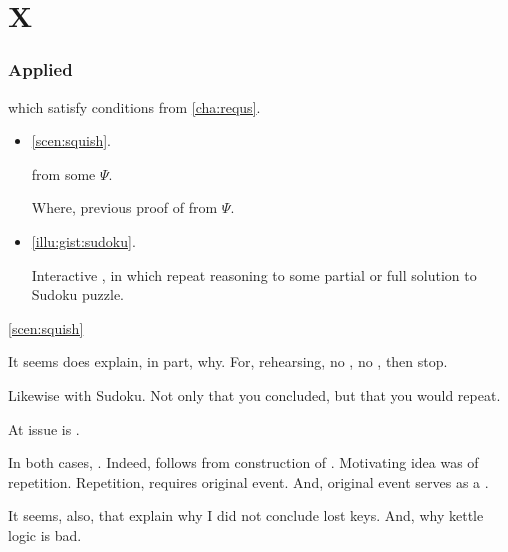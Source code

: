 \section{X}
\label{sec:x}


\subsubsection{Applied}
\label{sec:consequences}


\begin{note}
   which satisfy conditions from \autoref{cha:requs}.
  \begin{itemize}
  \item
    \autoref{scen:squish}.

     from some \pool{} \(\Psi\).

    Where, previous proof of  from \(\Psi\).
  \item
    \autoref{illu:gist:sudoku}.

    Interactive , in which  repeat reasoning to some partial or full solution to Sudoku puzzle.
  \end{itemize}
\end{note}

\begin{note}
  \autoref{scen:squish}

  It seems does explain, in part, why.
  For, rehearsing, no \ros{}, no \fc{}, then stop.

  Likewise with Sudoku.
  Not only that you concluded, but that you would repeat.

  At issue is \tC{}.
\end{note}

\begin{note}
  In both cases, \wit{}.
  Indeed, \wit{} follows from construction of .
  Motivating idea was of repetition.
  Repetition, requires original event.
  And, original event serves as a \wit{}.
\end{note}

\begin{note}
  It seems, also, that explain why I did not conclude lost keys.
  And, why kettle logic is bad.
\end{note}




